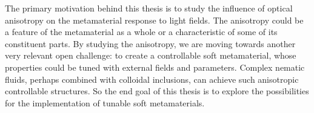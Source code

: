 \documentclass[a4paper,11pt]{article}
\begin{document}
The primary motivation behind this thesis is to study the influence of optical anisotropy on the metamaterial response to light fields.
The anisotropy could be a feature of the metamaterial as a whole or a characteristic of some of its constituent parts. 
By studying the anisotropy, we are moving towards another very relevant open challenge: to create a controllable soft metamaterial, whose properties could be tuned with external fields and parameters. 
Complex nematic fluids, perhaps combined with colloidal inclusions, can achieve such anisotropic controllable structures. 
So the end goal of this thesis is to explore the possibilities for the implementation of tunable soft metamaterials. 

% 
% 
% 
% 




\end{document}
